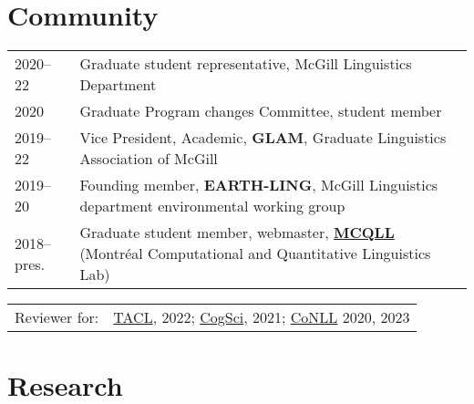 \documentclass[11pt,a4paper]{article}
\begin{document}
  \section{Community}
  \begin{longtable}{p{1.7cm}|p{15cm}}
    \textsc{2020--22}
    &%
    Graduate student representative, McGill Linguistics Department\\
    2020
    &%
    Graduate Program changes Committee, student member\\
    \textsc{2019--22}
    &%
    Vice President, Academic, \textbf{GLAM}, Graduate Linguistics Association of
    McGill\\
    \textsc{2019--20}&%
    Founding member, \textbf{EARTH-LING}, McGill Linguistics department
    environmental working group\\
    \textsc{2018--}pres.
    &%
    Graduate student member, webmaster, \href{http://mcqll.org}{\textbf{MCQLL}} (Montréal Computational and Quantitative
    Linguistics Lab)\\
  \end{longtable}
  \begin{longtable}[l]{ll}
    Reviewer for:
    &%
    \href{https://transacl.org/}{TACL}, 2022;
    \href{https://cognitivesciencesociety.org/}{CogSci}, 2021;
    \href{https://www.conll.org/}{CoNLL} 2020, 2023
  \end{longtable}



  \section{Research}

  \vspace{5pt}
  \nocite{%
    hoover.j:2024phd,%
    rahimi.h:2024,%
    hoover.j:2023,%
    socolof.m:2022coling,%
    hoover.j:2022amlap,%
    hoover.j:2021emnlp,%
    hoover.j:2021wccfl%
  }
  \AtNextBibliography{\small}
  \printbibliography[heading=none]{}
  \vspace{5pt}
\end{document}
